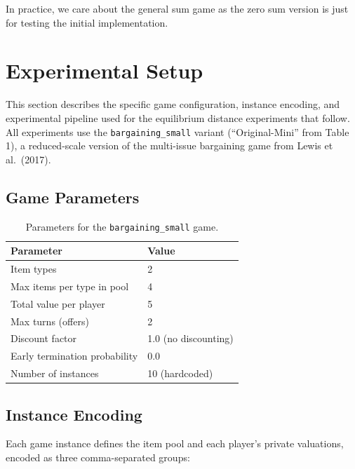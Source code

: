 \documentclass[11pt]{article}
\begin{document}
In practice, we care about the general sum game as the zero sum version is just for testing the initial implementation.

















\newpage

\section{Experimental Setup}

This section describes the specific game configuration, instance encoding, and experimental pipeline used for the equilibrium distance experiments that follow. All experiments use the \texttt{bargaining\_small} variant (``Original-Mini'' from Table 1), a reduced-scale version of the multi-issue bargaining game from Lewis et al.~(2017).

\subsection{Game Parameters}

\begin{table}[H]
\centering
\begin{tabular}{@{}ll@{}}
\toprule
\textbf{Parameter} & \textbf{Value} \\
\midrule
Item types & 2 \\
Max items per type in pool & 4 \\
Total value per player & 5 \\
Max turns (offers) & 2 \\
Discount factor & 1.0 (no discounting) \\
Early termination probability & 0.0 \\
Number of instances & 10 (hardcoded) \\
\bottomrule
\end{tabular}
\caption{Parameters for the \texttt{bargaining\_small} game.}
\end{table}

\subsection{Instance Encoding}

Each game instance defines the item pool and each player's private valuations, encoded as three comma-separated groups:
\end{document}
